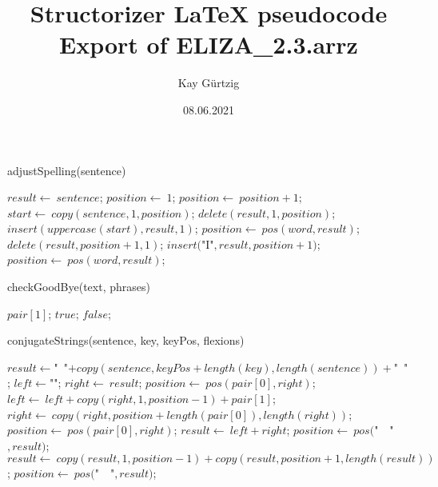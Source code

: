 \documentclass[a4paper,10pt]{article}
\title{Structorizer LaTeX pseudocode Export of ELIZA_2.3.arrz}
\author{Kay Gürtzig}
\date{08.06.2021}
\begin{document}
\begin{algorithm}
\caption{adjustSpelling(sentence)}
\begin{algorithmic}[5]

\STATE {}
  \STATE \(result\gets\ sentence\);
  \STATE \(position\gets\ 1\);
    \STATE \(position\gets\ position+1\);
  \ENDWHILE
    \STATE \(start\gets\ copy(sentence,1,position)\);
    \STATE \(delete(result,1,position)\);
    \STATE \(insert(uppercase(start),result,1)\);
  \ENDIF
    \STATE \(position\gets\ pos(word,result)\);
      \STATE \(delete(result,position+1,1)\);
      \STATE \(insert(\)"{}I"{}\(,result,position+1)\);
      \STATE \(position\gets\ pos(word,result)\);
    \ENDWHILE
  \ENDFOR

\end{algorithmic}
\end{algorithm}


\begin{algorithm}
\caption{checkGoodBye(text, phrases)}
\begin{algorithmic}[5]

\STATE {}
\STATE {}
\STATE {}
\STATE {}
      \PRINT\(pair[1]\);
      \RETURN\(true\);
    \ENDIF
  \ENDFOR
  \RETURN\(false\);

\end{algorithmic}
\end{algorithm}


\begin{algorithm}
\caption{conjugateStrings(sentence, key, keyPos, flexions)}
\begin{algorithmic}[5]

  \STATE \(result\gets\)"{}\ "{}\(+copy(sentence,keyPos+length(key),length(sentence))+\)"{}\ "{}\(\);
    \STATE \(left\gets\)"{}"{}\(\);
    \STATE \(right\gets\ result\);
    \STATE \(position\gets\ pos(pair[0],right)\);
      \STATE \(left\gets\ left+copy(right,1,position-1)+pair[1]\);
      \STATE \(right\gets\ copy(right,position+length(pair[0]),length(right))\);
      \STATE \(position\gets\ pos(pair[0],right)\);
    \ENDWHILE
    \STATE \(result\gets\ left+right\);
  \ENDFOR
  \STATE \(position\gets\ pos(\)"{}\ \ "{}\(,result)\);
    \STATE \(result\gets\ copy(result,1,position-1)+copy(result,position+1,length(result))\);
    \STATE \(position\gets\ pos(\)"{}\ \ "{}\(,result)\);
  \ENDWHILE

\end{algorithmic}
\end{algorithm}
\end{document}
